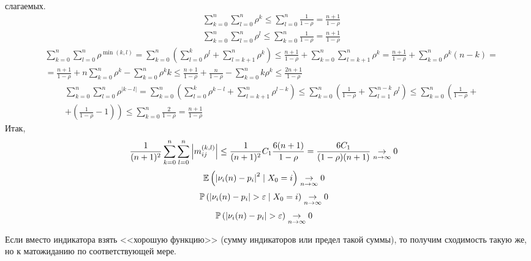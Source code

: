 \begin{Proof}
    слагаемых.
    \begin{align*}
      & \sum_{k=0}^n\sum_{l=0}^n \rho^k \leq \sum_{l=0}^n \frac{1}{1-\rho} = \frac{n+1}{1-\rho}
    \end{align*}
    \begin{align*}
      & \sum_{k=0}^n\sum_{l=0}^n \rho^l \leq \sum_{k=0}^n \frac{1}{1-\rho} = \frac{n+1}{1-\rho}
    \end{align*}
    \begin{align*}
      & \sum_{k=0}^n\sum_{l=0}^n \rho^{\min(k,l)} = \sum_{k=0}^n\left( \sum_{l=0}^k \rho^{l} + \sum_{l=k+1}^n \rho^k \right) \leq \frac{n+1}{1-\rho} + \sum_{k=0}^n \sum_{l=k+1}^n \rho^k = \frac{n+1}{1-\rho} + \sum_{k=0}^n \rho^k(n-k) = \\
      & = \frac{n+1}{1-\rho} + n\sum_{k=0}^n \rho^k-\sum_{k=0}^n \rho^kk \leq \frac{n+1}{1-\rho} + \frac{n}{1-\rho} -\sum_{k=0}^n k\rho^k \leq \frac{2n+1}{1-\rho}
    \end{align*}
    \begin{align*}
      & \sum_{k=0}^n\sum_{l=0}^n \rho^{\left| k-l \right|} = \sum_{k=0}^n\left( \sum_{l=0}^k \rho^{k-l} + \sum_{l=k+1}^n \rho^{l-k} \right) \leq \sum_{k=0}^n\left( \frac{1}{1-\rho} + \sum_{l=1}^{n-k} \rho^{l} \right) \leq \sum_{k=0}^n\left( \frac{1}{1-\rho} +  \right. \\
      & \left. + \left( \frac{1}{1-\rho} - 1 \right) \right) \leq \sum_{k=0}^n\frac{2}{1-\rho} = \frac{n+1}{1-\rho}
    \end{align*}
    Итак,
    \begin{align*}
      & \frac{1}{(n+1)^2}\sum_{k=0}^n \sum_{l=0}^n \left| m_{ij}^{(k,l)}\right| \leq \frac{1}{(n+1)^2} C_1\frac{6(n+1)}{1-\rho} = \frac{6C_1}{(1-\rho)(n+1)} \underset{n \to \infty}\rightarrow 0
    \end{align*}
    \begin{align*}
      & \mathbb{E}\left( \left| \nu_i(n)-p_i \right|^2 \mid X_0 = i \right) \underset{n \to \infty}\rightarrow 0
    \end{align*}
    \begin{align*}
      & \PP\left( \left| \nu_i(n)-p_i \right|> \varepsilon \mid X_0 = i \right) \To{n \to \infty} 0
    \end{align*}
    \begin{align*}
      & \PP\left( \left| \nu_i(n)-p_i \right|> \varepsilon \right) \To{n \to \infty} 0
    \end{align*}
\end{Proof}
\begin{Note}
    Если вместо индикатора взять <<хорошую функцию>> (сумму индикаторов или
    предел такой суммы), то получим сходимость такую же, но к матожиданию по
    соответствующей мере.
\end{Note}